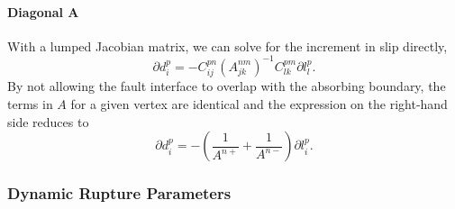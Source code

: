 \paragraph{Diagonal A}

With a lumped Jacobian matrix, we can solve for the increment in slip
directly,
\begin{equation}
\partial d_{i}^{p}=-C_{ij}^{pn}(A_{jk}^{nm})^{-1}C_{lk}^{pm}\partial l_{l}^{p}.
\end{equation}
By not allowing the fault interface to overlap with the absorbing
boundary, the terms in $A$ for a given vertex are identical and the
expression on the right-hand side reduces to
\begin{equation}
\partial d_{i}^{p}=-\left(\frac{1}{A^{n+}}+\frac{1}{A^{n-}}\right)\partial l_{i}^{p}.
\end{equation}



\subsubsection{Dynamic Rupture Parameters}

